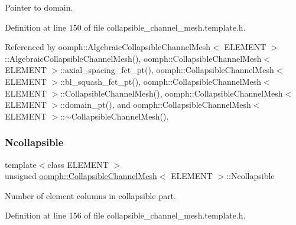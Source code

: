 Pointer to domain. 



Definition at line 150 of file collapsible\+\_\+channel\+\_\+mesh.\+template.\+h.



Referenced by oomph\+::\+Algebraic\+Collapsible\+Channel\+Mesh$<$ E\+L\+E\+M\+E\+N\+T $>$\+::\+Algebraic\+Collapsible\+Channel\+Mesh(), oomph\+::\+Collapsible\+Channel\+Mesh$<$ E\+L\+E\+M\+E\+N\+T $>$\+::axial\+\_\+spacing\+\_\+fct\+\_\+pt(), oomph\+::\+Collapsible\+Channel\+Mesh$<$ E\+L\+E\+M\+E\+N\+T $>$\+::bl\+\_\+squash\+\_\+fct\+\_\+pt(), oomph\+::\+Collapsible\+Channel\+Mesh$<$ E\+L\+E\+M\+E\+N\+T $>$\+::\+Collapsible\+Channel\+Mesh(), oomph\+::\+Collapsible\+Channel\+Mesh$<$ E\+L\+E\+M\+E\+N\+T $>$\+::domain\+\_\+pt(), and oomph\+::\+Collapsible\+Channel\+Mesh$<$ E\+L\+E\+M\+E\+N\+T $>$\+::$\sim$\+Collapsible\+Channel\+Mesh().

\mbox{\label{classoomph_1_1CollapsibleChannelMesh_aa59ff7af47247b2e17b13c45f83fcf86}} 
\subsubsection{\texorpdfstring{Ncollapsible}{Ncollapsible}}
{\footnotesize\ttfamily template$<$class E\+L\+E\+M\+E\+NT $>$ \\
unsigned \hyperlink{classoomph_1_1CollapsibleChannelMesh}{oomph\+::\+Collapsible\+Channel\+Mesh}$<$ E\+L\+E\+M\+E\+NT $>$\+::Ncollapsible\hspace{0.3cm}{\ttfamily [protected]}}



Number of element columns in collapsible part. 



Definition at line 156 of file collapsible\+\_\+channel\+\_\+mesh.\+template.\+h.

\mbox{\label{classoomph_1_1CollapsibleChannelMesh_acd1b5ea7597a079b4321d3658f2e03f4}} 
